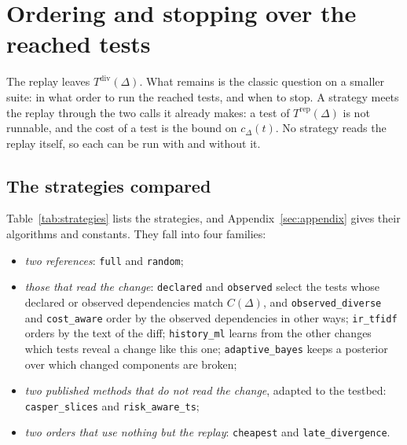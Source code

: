 \documentclass[11pt,a4paper]{article}
\newcommand{\strat}[1]{\texttt{#1}}
\begin{document}
\section{Ordering and stopping over the reached tests}
\label{sec:method}

The replay leaves $T^{\mathrm{div}}(\Delta)$. What remains is the classic question on a smaller suite: in what
order to run the reached tests, and when to stop. A strategy meets the replay through the two calls it already
makes: a test of $T^{\mathrm{rep}}(\Delta)$ is not runnable, and the cost of a test is the bound on
$c_\Delta(t)$. No strategy reads the replay itself, so each can be run with and without it.

\subsection{The strategies compared}

Table~\ref{tab:strategies} lists the strategies, and Appendix~\ref{sec:appendix} gives their algorithms and
constants. They fall into four families:
\begin{itemize}
  \item \emph{two references}: \strat{full} and \strat{random};
  \item \emph{those that read the change}: \strat{declared} and \strat{observed} select the tests whose declared
        or observed dependencies match $C(\Delta)$, and \strat{observed\_diverse} and \strat{cost\_aware} order by
        the observed dependencies in other ways; \strat{ir\_tfidf} orders by the text of the diff;
        \strat{history\_ml} learns from the other changes which tests reveal a change like this one;
        \strat{adaptive\_bayes} keeps a posterior over which changed components are broken;
  \item \emph{two published methods that do not read the change}, adapted to the testbed:
        \strat{casper\_slices} and \strat{risk\_aware\_ts};
  \item \emph{two orders that use nothing but the replay}: \strat{cheapest} and \strat{late\_divergence}.
\end{itemize}
\end{document}
